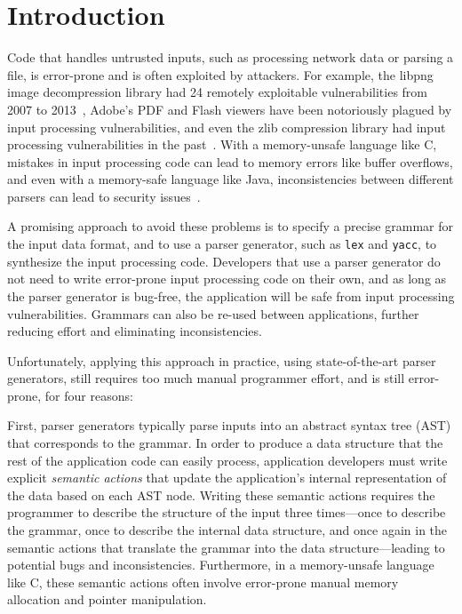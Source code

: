 \chapter{Introduction}

Code that handles untrusted inputs, such as processing network
data or parsing a file, is error-prone and is often exploited by
attackers.
For example, the libpng image decompression library had 24 remotely
exploitable vulnerabilities from 2007 to 2013~\cite{cvedetails:libpng},
Adobe's PDF and Flash viewers have been notoriously plagued by input
processing vulnerabilities, and even the zlib compression library had
input processing vulnerabilities in the past~\cite{cvedetails:zlib}.
With a memory-unsafe language like C, mistakes in input processing
code can lead to memory errors like buffer overflows, and even with
a memory-safe language like Java, inconsistencies between different
parsers can lead to security issues~\cite{saurik-masterkey}.

A promising approach to avoid these problems is to specify
a precise grammar for the input data format, and to use a parser
generator, such as {\tt lex} and {\tt yacc}, to synthesize the input
processing code.  Developers that use a parser generator do not need
to write error-prone input processing code on their own, and as long
as the parser generator is bug-free, the application will be safe from
input processing vulnerabilities. Grammars can also be re-used between
applications, further reducing effort and eliminating inconsistencies.

Unfortunately, applying this approach in practice, using state-of-the-art
parser generators, still requires too much manual programmer effort,
and is still error-prone, for four reasons:

First, parser generators typically parse inputs into an abstract syntax
tree (AST) that corresponds to the grammar.  In order to produce a data
structure that the rest of the application code can easily process,
application developers must write explicit {\em semantic actions} that
update the application's internal representation of the data based on
each AST node.  
Writing these semantic actions requires the programmer to describe the
structure of the input three
times---once to describe the grammar, once to describe the internal data
structure, and once again in the semantic actions that translate the
grammar into the data structure---leading to potential bugs and
inconsistencies.
Furthermore, in a memory-unsafe language like C, these semantic
actions often involve error-prone manual memory allocation and
pointer manipulation.

